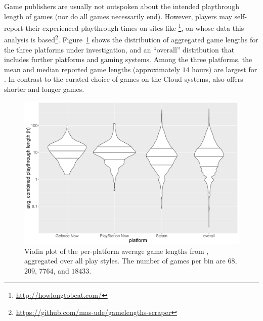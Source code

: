 Game publishers are usually not outspoken about the intended playthrough length of games (nor do all games necessarily end). However, players may self-report their experienced playthrough times on sites like \hltb\footnote{\url{http://howlongtobeat.com/}}, on whose data this analysis is based\footnote{\url{https://github.com/mas-ude/gamelengths-scraper}}. 
Figure~\ref{fig:gamelengths-violin} shows the distribution of aggregated game lengths for the three platforms under investigation, and an ``overall'' distribution that includes further platforms and gaming systems. Among the three platforms, the mean and median reported game lengths (approximately $14$ hours) are largest for \gfnow. In contrast to the curated choice of games on the Cloud systems, \steam also offers shorter and longer games.


\begin{figure}[!t]
	\centering
	\includegraphics[width=1.0\columnwidth]{images/gamelengths-by-platform-violin.pdf}
	\caption{Violin plot of the per-platform average game lengths from \hltb, aggregated over all play styles. The number of games per bin are $68$, $209$, $7764$, and $18433$.}
\label{fig:gamelengths-violin}
\end{figure}



